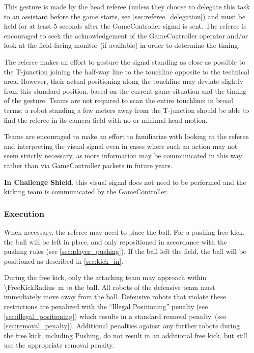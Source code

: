 This gesture is made by the head referee (unless they choose to delegate this task to an assistant before the game starts, see \cref{sec:referee_delegation}) and must be held for at least 5 seconds after the GameController signal is sent.
The referee is encouraged to seek the acknowledgement of the GameController operator and/or look at the field-facing monitor (if available) in order to determine the timing.

The referee makes an effort to gesture the signal standing as close as possible to the T-junction joining the half-way line to the touchline opposite to the technical area.
However, their actual positioning along the touchline may deviate slightly from this standard position, based on the current game situation and the timing of the gesture.
Teams are not required to scan the entire touchline:
in broad terms, a robot standing a few meters away from the T-junction should be able to find the referee in its camera field with no or minimal head motion.

Teams are encouraged to make an effort to familiarize with looking at the referee and interpreting the visual signal even in cases where such an action may not seem strictly necessary,
as more information may be communicated in this way rather than via GameController packets in future years.

\textbf{In Challenge Shield}, this visual signal does not need to be performed and the kicking team is communicated by the GameController.

\subsubsection{Execution}
\label{sec:free_kick_execution}

When necessary, the referee may need to place the ball.
For a pushing free kick, the ball will be left in place, and only repositioned in accordance with the pushing rules (see \cref{sec:player_pushing}).
If the ball left the field, the ball will be positioned as described in \cref{sec:kick_in}.

During the free kick, only the attacking team may approach within \qty{\FreeKickRadius}{\metre} to the ball.
All robots of the defensive team must immediately move away from the ball.
Defensive robots that violate these restrictions are penalized with the ``Illegal Positioning'' penalty (see \cref{sec:illegal_positioning}) which results in a standard removal penalty~(see \cref{sec:removal_penalty}).
Additional penalties against any further robots during the free kick, including Pushing, do not result in an additional free kick, but still use the appropriate removal penalty.

